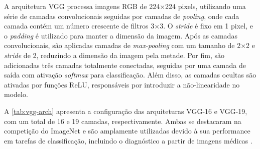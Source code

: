 A arquitetura VGG processa imagens RGB de 224×224 pixels, utilizando uma série de camadas convolucionais seguidas por camadas de \textit{pooling}, onde cada camada contém um número crescente de filtros 3×3. O \textit{stride} é fixo em 1 pixel, e o \textit{padding} é utilizado para manter a dimensão da imagem. Após as camadas convolucionais, são aplicadas camadas de \textit{max-pooling} com um tamanho de 2×2 e \textit{stride} de 2, reduzindo a dimensão da imagem pela metade. Por fim, são adicionadas três camadas totalmente conectadas, seguidas por uma camada de saída com ativação \textit{softmax} para classificação. Além disso, as camadas ocultas são ativadas por funções ReLU, responsáveis por introduzir a não-linearidade no modelo.

A \autoref{tab:vgg-arch} apresenta a configuração das arquiteturas VGG-16 e VGG-19, com um total de 16 e 19 camadas, respectivamente. Ambas se destacaram na competição do ImageNet e são amplamente utilizadas devido à sua performance em tarefas de classificação, incluindo o diagnóstico a partir de imagens médicas \cite{Saini2023, Sitaula2021}.

